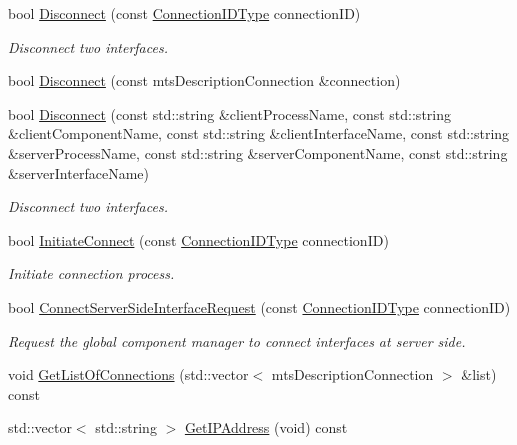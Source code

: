\begin{DoxyCompactItemize}
bool \hyperlink{classmts_manager_global_a76821bdfa173c602a1e2822abbd30207}{Disconnect} (const \hyperlink{mts_forward_declarations_8h_ad3543bb11742e1766374ec96016d6547}{Connection\+I\+D\+Type} connection\+I\+D)
\begin{DoxyCompactList}\small\item\em Disconnect two interfaces. \end{DoxyCompactList}\item 
bool \hyperlink{classmts_manager_global_a8f1aacccac9488a3ec0aeb4ecc547c7c}{Disconnect} (const mts\+Description\+Connection \&connection)
\item 
bool \hyperlink{classmts_manager_global_abfa53d9b4051f79c7b413ce1fa2b8cc9}{Disconnect} (const std\+::string \&client\+Process\+Name, const std\+::string \&client\+Component\+Name, const std\+::string \&client\+Interface\+Name, const std\+::string \&server\+Process\+Name, const std\+::string \&server\+Component\+Name, const std\+::string \&server\+Interface\+Name)
\begin{DoxyCompactList}\small\item\em Disconnect two interfaces. \end{DoxyCompactList}\item 
bool \hyperlink{classmts_manager_global_a395aea7f5f6c28d676bd9f2d05b72ff6}{Initiate\+Connect} (const \hyperlink{mts_forward_declarations_8h_ad3543bb11742e1766374ec96016d6547}{Connection\+I\+D\+Type} connection\+I\+D)
\begin{DoxyCompactList}\small\item\em Initiate connection process. \end{DoxyCompactList}\item 
bool \hyperlink{classmts_manager_global_acf0a8009a35013ec30c1fddda725eb20}{Connect\+Server\+Side\+Interface\+Request} (const \hyperlink{mts_forward_declarations_8h_ad3543bb11742e1766374ec96016d6547}{Connection\+I\+D\+Type} connection\+I\+D)
\begin{DoxyCompactList}\small\item\em Request the global component manager to connect interfaces at server side. \end{DoxyCompactList}\item 
void \hyperlink{classmts_manager_global_ab53df6ad67125ff7682e5a091287d2ec}{Get\+List\+Of\+Connections} (std\+::vector$<$ mts\+Description\+Connection $>$ \&list) const 
\item 
std\+::vector$<$ std\+::string $>$ \hyperlink{classmts_manager_global_a9a61d5f94f5cef7bb85b4184fbb971cd}{Get\+I\+P\+Address} (void) const 

\end{DoxyCompactItemize}
